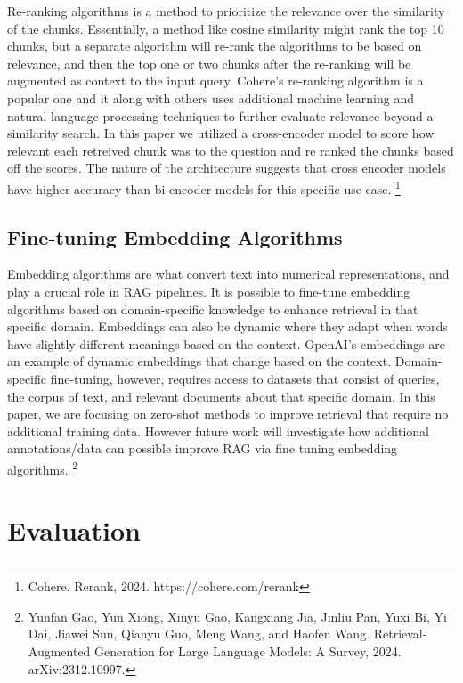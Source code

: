 \documentclass{article}
\begin{document}
    \noindent Re-ranking algorithms is a method to prioritize the relevance over the similarity of the chunks. Essentially, a method like cosine similarity might rank the top 10 chunks, but a separate algorithm will re-rank the algorithms to be based on relevance, and then the top one or two chunks after the re-ranking will be augmented as context to the input query. Cohere's re-ranking algorithm is a popular one and it along with others uses additional machine learning and natural language processing techniques to further evaluate relevance beyond a similarity search. In this paper we utilized a cross-encoder model to score how relevant each retreived chunk was to the question and re ranked the chunks based off the scores. The nature of the architecture suggests that cross encoder models have higher accuracy than bi-encoder models for this specific use case. \footnote{Cohere. Rerank, 2024. https://cohere.com/rerank}
    
    \subsection{Fine-tuning Embedding Algorithms}
    Embedding algorithms are what convert text into numerical representations, and play a crucial role in RAG pipelines. It is possible to fine-tune embedding algorithms based on domain-specific knowledge to enhance retrieval in that specific domain. Embeddings can also be dynamic where they adapt when words have slightly different meanings based on the context. OpenAI's embeddings are an example of dynamic embeddings that change based on the context. Domain-specific fine-tuning, however, requires access to datasets that consist of queries, the corpus of text, and relevant documents about that specific domain. In this paper, we are focusing on zero-shot methods to improve retrieval that require no additional training data. However future work will investigate how additional annotations/data can possible improve RAG via fine tuning embedding algorithms. \footnote{Yunfan Gao, Yun Xiong, Xinyu Gao, Kangxiang Jia, Jinliu Pan, Yuxi Bi, Yi Dai, Jiawei Sun, Qianyu Guo, Meng Wang, and Haofen Wang. Retrieval-Augmented Generation for Large Language Models: A Survey, 2024. arXiv:2312.10997.}



    \section{Evaluation}
\end{document}
